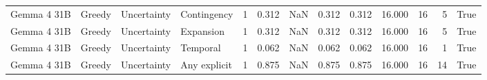 \begin{tabular}{llllrrrrrrrrr}
Gemma 4 31B & Greedy & Uncertainty & Contingency & 1 & 0.312 & NaN & 0.312 & 0.312 & 16.000 & 16 & 5 & True \\
Gemma 4 31B & Greedy & Uncertainty & Expansion & 1 & 0.312 & NaN & 0.312 & 0.312 & 16.000 & 16 & 5 & True \\
Gemma 4 31B & Greedy & Uncertainty & Temporal & 1 & 0.062 & NaN & 0.062 & 0.062 & 16.000 & 16 & 1 & True \\
Gemma 4 31B & Greedy & Uncertainty & Any explicit & 1 & 0.875 & NaN & 0.875 & 0.875 & 16.000 & 16 & 14 & True \\
\bottomrule
\end{tabular}
